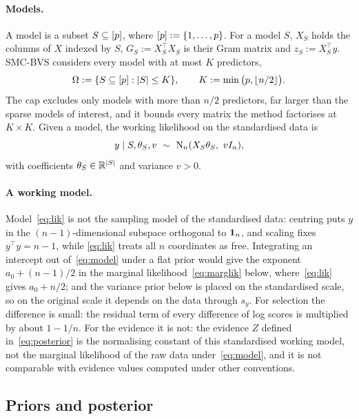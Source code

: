 \paragraph{Models.} A model is a subset $S\subseteq[p]$, where $[p]:=\{1,\dots,p\}$. For a model $S$,
$X_S$ holds the columns of $X$ indexed by $S$, $G_S:=X_S^\top X_S$ is their Gram matrix and $z_S:=X_S^\top y$. SMC-BVS
considers every model with at most $K$ predictors,
\begin{equation}\label{eq:space}
  \Omega:=\{S\subseteq[p]:\lvert S\rvert\le K\},\qquad K:=\min\big(p,\lfloor n/2\rfloor\big).
\end{equation}
The cap excludes only models with more than $n/2$ predictors, far larger than the sparse models of interest, and it
bounds every matrix the method factorises at $K\times K$. Given a model, the working likelihood on the standardised
data is
\begin{equation}\label{eq:lik}
  y\mid S,\theta_S,v\ \sim\ \mathrm{N}_n(X_S\theta_S,\ vI_n),
\end{equation}
with coefficients $\theta_S\in\mathbb{R}^{\lvert S\rvert}$ and variance $v>0$.

\paragraph{A working model.} Model~\eqref{eq:lik} is not the sampling model of the standardised data: centring puts
$y$ in the $(n-1)$-dimensional subspace orthogonal to $\mathbf{1}_n$, and scaling fixes $y^\top y=n-1$, while
\eqref{eq:lik} treats all $n$ coordinates as free. Integrating an intercept out of~\eqref{eq:model} under a flat prior
would give the exponent $a_0+(n-1)/2$ in the marginal likelihood~\eqref{eq:marglik} below, where~\eqref{eq:lik} gives
$a_0+n/2$; and the variance prior below is placed on the standardised scale, so on the original scale it depends on
the data through $s_y$. For selection the difference is small: the residual term of every difference of log scores
is multiplied by about $1-1/n$. For the evidence it is not: the evidence $Z$ defined in~\eqref{eq:posterior} is the
normalising constant of this standardised working model, not the marginal likelihood of the raw data
under~\eqref{eq:model}, and it is not comparable with evidence values computed under other conventions.

\subsection{Priors and posterior}\label{sec:model-prior}

